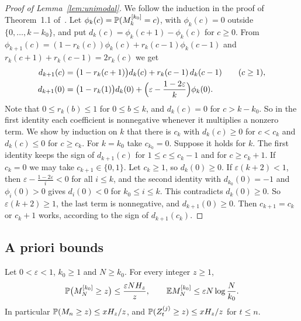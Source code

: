 \begin{proof}[Proof of Lemma~\ref{lem:unimodal}]
We follow the induction in the proof of Theorem~1.1 of~\cite{glrs2025}. Let
$\phi_k(c)=\mathbb{P}(M^{[k_0]}_k=c)$, with $\phi_k(c)=0$ outside
$\{0,\dots,k-k_0\}$, and put $d_k(c)=\phi_k(c+1)-\phi_k(c)$ for $c\ge0$.
From $\phi_{k+1}(c)=(1-r_k(c))\phi_k(c)+r_k(c-1)\phi_k(c-1)$ and
$r_k(c+1)+r_k(c-1)=2r_k(c)$ we get
\begin{align*}
 d_{k+1}(c)&=\bigl(1-r_k(c+1)\bigr)d_k(c)+r_k(c-1)\,d_k(c-1)\qquad(c\ge1),\\
 d_{k+1}(0)&=\bigl(1-r_k(1)\bigr)d_k(0)+\Bigl(\varepsilon-\frac{1-2\varepsilon}{k}\Bigr)\phi_k(0).
\end{align*}
Note that $0\le r_k(b)\le1$ for $0\le b\le k$, and $d_k(c)=0$ for
$c>k-k_0$. So in the first identity each coefficient is nonnegative
whenever it multiplies a nonzero term. We show by induction on $k$ that
there is $c_k$ with $d_k(c)\ge0$ for $c<c_k$ and $d_k(c)\le0$ for $c\ge c_k$.
For $k=k_0$ take $c_{k_0}=0$. Suppose it holds for $k$. The first identity
keeps the sign of $d_{k+1}(c)$ for $1\le c\le c_k-1$ and for $c\ge c_k+1$.
If $c_k=0$ we may take $c_{k+1}\in\{0,1\}$. Let $c_k\ge1$, so $d_k(0)\ge0$.
If $\varepsilon(k+2)<1$, then $\varepsilon-\frac{1-2\varepsilon}{i}<0$ for all
$i\le k$, and the second identity with $d_{k_0}(0)=-1$ and $\phi_i(0)>0$
gives $d_i(0)<0$ for $k_0\le i\le k$. This contradicts $d_k(0)\ge0$. So
$\varepsilon(k+2)\ge1$, the last term is nonnegative, and $d_{k+1}(0)\ge0$.
Then $c_{k+1}=c_k$ or $c_k+1$ works, according to the sign of
$d_{k+1}(c_k)$.
\end{proof}

\subsection{A priori bounds}\label{app:shape-apriori}

\begin{lemma}[tail]\label{lem:B-tail}
Let $0<\varepsilon<1$, $k_0\ge1$ and $N\ge k_0$. For every integer $z\ge1$,
\[
 \mathbb{P}\bigl(M^{[k_0]}_N\ge z\bigr)\le\frac{\varepsilon NH_z}{z},\qquad
 \mathbb{E} M^{[k_0]}_N\le\varepsilon N\log\frac N{k_0}.
\]
In particular $\mathbb{P}(M_n\ge z)\le xH_z/z$, and
$\mathbb{P}(Z^{(j)}_t\ge z)\le xH_z/z$ for $t\le n$.
\end{lemma}

